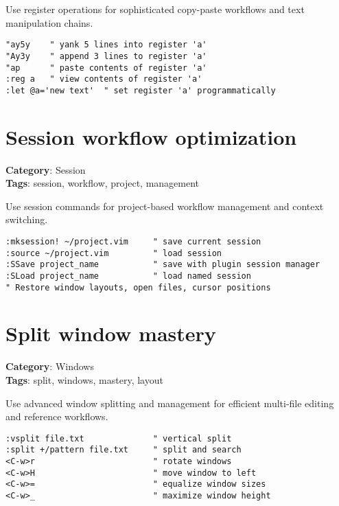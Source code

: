 {{{Use register operations for sophisticated copy-paste workflows and text manipulation chains.

\begin{Exa*}{}
\begin{Verbatim}[fontsize=\footnotesize, breaklines, breakanywhere]
"ay5y    " yank 5 lines into register 'a'
"Ay3y    " append 3 lines to register 'a'
"ap      " paste contents of register 'a'
:reg a   " view contents of register 'a'
:let @a='new text'  " set register 'a' programmatically
\end{Verbatim}
\end{Exa*}

\section{Session workflow optimization}

\textbf{Category}: Session\\ \textbf{Tags}: session, workflow, project, management
\vspace{0.5cm}

Use session commands for project-based workflow management and context switching.

\begin{Exa*}{}
\begin{Verbatim}[fontsize=\footnotesize, breaklines, breakanywhere]
:mksession! ~/project.vim     " save current session
:source ~/project.vim         " load session
:SSave project_name           " save with plugin session manager
:SLoad project_name           " load named session
" Restore window layouts, open files, cursor positions
\end{Verbatim}
\end{Exa*}

\section{Split window mastery}

\textbf{Category}: Windows\\ \textbf{Tags}: split, windows, mastery, layout
\vspace{0.5cm}

Use advanced window splitting and management for efficient multi-file editing and reference workflows.

\begin{Exa*}{}
\begin{Verbatim}[fontsize=\footnotesize, breaklines, breakanywhere]
:vsplit file.txt              " vertical split
:split +/pattern file.txt     " split and search
<C-w>r                        " rotate windows
<C-w>H                        " move window to left
<C-w>=                        " equalize window sizes
<C-w>_                        " maximize window height
\end{Verbatim}
\end{Exa*}

}}}
